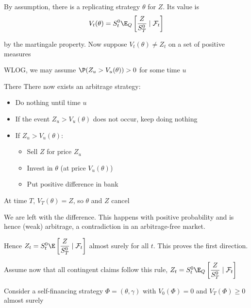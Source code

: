 \begin{prf}[]{}
  By assumption, there is a replicating strategy $\theta$ for $Z$. Its value is
  \begin{equation*}
    \begin{gathered}
      V_t(\theta) = S_t^0\E_Q\left[\dfrac{Z}{S_T^0}\mid\mathcal{F}_t\right]
    \end{gathered}
  \end{equation*}\par
  \noindent by the martingale property. Now suppose $V_t(\theta) \neq Z_t$ on a set of positive measures\par
  \noindent WLOG, we may assume $\P(Z_u>V_u(\theta))>0$ for some time $u$\par
  \noindent There
  There now exists an arbitrage strategy:\par
  \begin{itemize}
    \item Do nothing until time $u$
    \item If the event $Z_u>V_u(\theta)$ does not occur, keep doing nothing
    \item If $Z_u>V_u(\theta)$:\par
      \begin{itemize}
        \item Sell $Z$ for price $Z_u$
        \item Invest in $\theta$ (at price $V_u(\theta)$)
        \item Put positive difference in bank
      \end{itemize}
  \end{itemize}
  \par\bigskip
  \noindent At time $T$, $V_T(\theta) = Z$, so $\theta$ and $Z$ cancel\par
  \noindent We are left with the difference. This happens with positive probability and is hence (weak) arbitrage, a contradiction in an arbitrage-free market.\par
  \noindent Hence $Z_t = S_t^0\E\left[\dfrac{Z}{S_T^0}\mid\mathcal{F}_t\right]$ almost surely for all $t$. This proves the first direction.
  \par\bigskip
  \noindent Assume now that all contingent claims follow this rule, $Z_t = S_t^0\E_Q\left[\dfrac{Z}{S_T^0}\mid\mathcal{F}_t\right]$\par
  \noindent Consider a self-financing strategy $\Phi = (\theta,\gamma)$ with $V_0(\Phi) = 0$ and $V_T(\Phi) \geq0$ almost surely
  \begin{equation*}

\end{equation*}
\end{prf}
